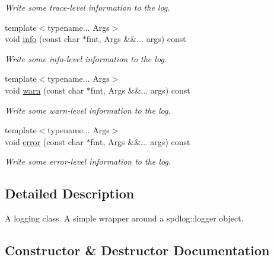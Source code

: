 \begin{DoxyCompactItemize}
\begin{DoxyCompactList}\small\item\em Write some trace-\/level information to the log. \end{DoxyCompactList}\item 
{\footnotesize template$<$typename... Args$>$ }\\void \mbox{\hyperlink{classmoka_1_1logger_ab2b824435132d3e2231e6b54b5dc78fe}{info}} (const char $\ast$fmt, Args \&\&... args) const
\begin{DoxyCompactList}\small\item\em Write some info-\/level information to the log. \end{DoxyCompactList}\item 
{\footnotesize template$<$typename... Args$>$ }\\void \mbox{\hyperlink{classmoka_1_1logger_a6e1a76b91ec700ab2305e22ea96fe621}{warn}} (const char $\ast$fmt, Args \&\&... args) const
\begin{DoxyCompactList}\small\item\em Write some warn-\/level information to the log. \end{DoxyCompactList}\item 
{\footnotesize template$<$typename... Args$>$ }\\void \mbox{\hyperlink{classmoka_1_1logger_a11b70dc17024e339eb34ee5cd9c87e53}{error}} (const char $\ast$fmt, Args \&\&... args) const
\begin{DoxyCompactList}\small\item\em Write some error-\/level information to the log. \end{DoxyCompactList}\end{DoxyCompactItemize}


\subsection{Detailed Description}
A logging class. A simple wrapper around a spdlog\+::logger object. 

\subsection{Constructor \& Destructor Documentation}
\mbox{\label{classmoka_1_1logger_ab6da934b4b7a08e2734ffc09f9a49a55}} 
